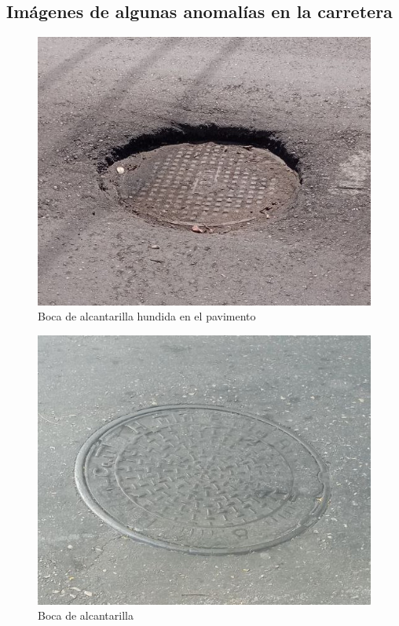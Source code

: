 \begin{appendices}
	\section*{Imágenes de algunas anomalías en la carretera}
		\begin{figure}[htb]
			  \centering
			  \includegraphics[scale = 0.4]{Graphics/pothole_3.jpg}
			  \caption{Boca de alcantarilla hundida en el pavimento}
			  \label{fig:13}
		\end{figure}

		\begin{figure}[htb]
			  \centering
			  \includegraphics[scale = 0.4]{Graphics/pothole_9.jpg}
			  \caption{Boca de alcantarilla}
			  \label{fig:14}
		\end{figure}
		\newpage


\end{appendices}
